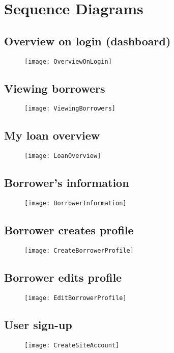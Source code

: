 \section{Sequence Diagrams}



\subsection{Overview on login (dashboard)}

\begin{figure}[H]
\centering
\texttt{[image: OverviewOnLogin]}
\end{figure}


\subsection{Viewing borrowers}

\begin{figure}[H]
\centering
\texttt{[image: ViewingBorrowers]}
\end{figure}


\subsection{My loan overview}

\begin{figure}[H]
\centering
\texttt{[image: LoanOverview]}
\end{figure}


\subsection{Borrower's information}

\begin{figure}[H]
\centering
\texttt{[image: BorrowerInformation]}
\end{figure}


\subsection{Borrower creates profile}

\begin{figure}[H]
\centering
\texttt{[image: CreateBorrowerProfile]}
\end{figure}


\subsection{Borrower edits profile}

\begin{figure}[H]
\centering
\texttt{[image: EditBorrowerProfile]}
\end{figure}


\subsection{User sign-up}

\begin{figure}[H]
\centering
\texttt{[image: CreateSiteAccount]}
\end{figure}
